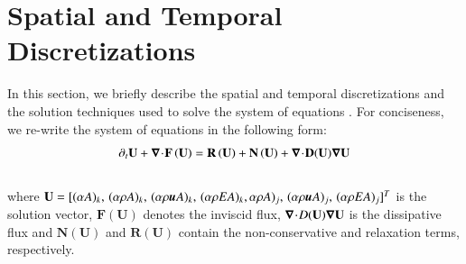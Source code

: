 \documentclass[preprint,10pt]{elsarticle}
\begin{document}
\section{Spatial and Temporal Discretizations} \label{sec:disc}
%
In this section, we briefly describe the spatial and temporal discretizations and the solution techniques 
used to solve the system of equations . For conciseness, we re-write the system of 
equations in the following form:
\begin{equation}
\label{eq:form}
\partial_t \mathbf{U} + \boldsymbol\nabla\! \cdot \! \mathbf{F} \left( \mathbf{U} \right) = \mathbf{R} \left( \mathbf{U} \right) + \mathbf{N} \left( \mathbf{U} \right) + \boldsymbol\nabla\! \cdot \! 
\mathbf{D}(\mathbf{U}) \boldsymbol\nabla \mathbf{U}
\end{equation}
\\
where $\mathbf{U}=[(\alpha A )_k, \, (\alpha \rho A)_k,\, (\alpha \rho \boldsymbol u A)_k,\, (\alpha \rho E A)_k, \alpha \rho A)_j,\, (\alpha \rho \boldsymbol u A)_j,\, (\alpha \rho E A)_j]^T$ is the solution vector, $\mathbf{F} 
\left( \mathbf{U} \right)$ denotes 
the inviscid flux, $\boldsymbol\nabla\! \cdot \! D (\mathbf{U}) \boldsymbol\nabla \mathbf{U}$ is the dissipative flux and $\mathbf{N} \left( \mathbf{U} \right)$ and $\mathbf{R} 
\left( \mathbf{U} \right)$ contain the non-conservative and relaxation terms, respectively. 
\end{document}
